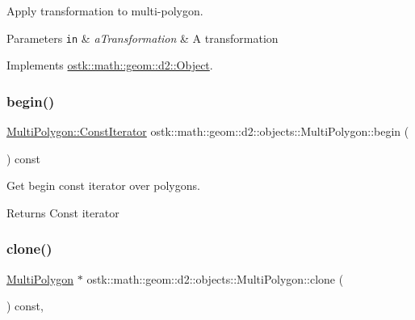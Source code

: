 Apply transformation to multi-\/polygon. 


\begin{DoxyParams}[1]{Parameters}
\mbox{\tt in}  & {\em a\+Transformation} & A transformation \\
\hline
\end{DoxyParams}


Implements \hyperlink{classostk_1_1math_1_1geom_1_1d2_1_1_object_a959e50211d7a680f7f904bbb752d75c9}{ostk\+::math\+::geom\+::d2\+::\+Object}.

\mbox{\label{classostk_1_1math_1_1geom_1_1d2_1_1objects_1_1_multi_polygon_a5de8561a4153ff2565817ba6ab5ba7ca}} 
\subsubsection{\texorpdfstring{begin()}{begin()}}
{\footnotesize\ttfamily \hyperlink{classostk_1_1math_1_1geom_1_1d2_1_1objects_1_1_multi_polygon_ade3439a576f75f37a3ebf8b4e195bad5}{Multi\+Polygon\+::\+Const\+Iterator} ostk\+::math\+::geom\+::d2\+::objects\+::\+Multi\+Polygon\+::begin (\begin{DoxyParamCaption}{ }\end{DoxyParamCaption}) const}



Get begin const iterator over polygons. 

\begin{DoxyReturn}{Returns}
Const iterator 
\end{DoxyReturn}
\mbox{\label{classostk_1_1math_1_1geom_1_1d2_1_1objects_1_1_multi_polygon_a89fdf23e9f496c2e5f598c0dc8981c86}} 
\subsubsection{\texorpdfstring{clone()}{clone()}}
{\footnotesize\ttfamily \hyperlink{classostk_1_1math_1_1geom_1_1d2_1_1objects_1_1_multi_polygon}{Multi\+Polygon} $\ast$ ostk\+::math\+::geom\+::d2\+::objects\+::\+Multi\+Polygon\+::clone (\begin{DoxyParamCaption}{ }\end{DoxyParamCaption}) const\hspace{0.3cm}{\ttfamily [override]}, {\ttfamily [virtual]}}



